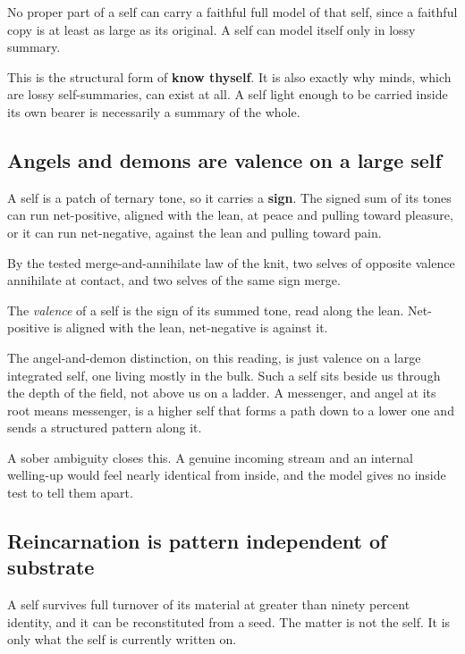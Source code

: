 \begin{theorem}
No proper part of a self can carry a faithful full model of that self, since a faithful copy is at least as large as its original. A self can model itself only in lossy summary.
\end{theorem}

This is the structural form of \textbf{know thyself}. It is also exactly why minds, which are lossy self-summaries, can exist at all. A self light enough to be carried inside its own bearer is necessarily a summary of the whole.

\subsection{Angels and demons are valence on a large self}

A self is a patch of ternary tone, so it carries a \textbf{sign}. The signed sum of its tones can run net-positive, aligned with the lean, at peace and pulling toward pleasure, or it can run net-negative, against the lean and pulling toward pain.

By the tested merge-and-annihilate law of the knit, two selves of opposite valence annihilate at contact, and two selves of the same sign merge.

\begin{definition}
The \emph{valence} of a self is the sign of its summed tone, read along the lean. Net-positive is aligned with the lean, net-negative is against it.
\end{definition}

The angel-and-demon distinction, on this reading, is just valence on a large integrated self, one living mostly in the bulk. Such a self sits beside us through the depth of the field, not above us on a ladder. A messenger, and angel at its root means messenger, is a higher self that forms a path down to a lower one and sends a structured pattern along it.

A sober ambiguity closes this. A genuine incoming stream and an internal welling-up would feel nearly identical from inside, and the model gives no inside test to tell them apart.

\subsection{Reincarnation is pattern independent of substrate}

A self survives full turnover of its material at greater than ninety percent identity, and it can be reconstituted from a seed. The matter is not the self. It is only what the self is currently written on.

